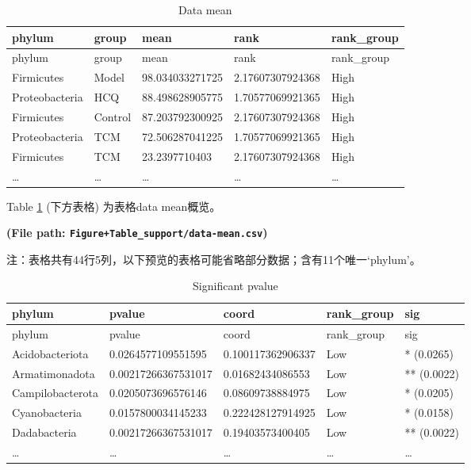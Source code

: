 \documentclass[
]{article}
\begin{document}
\begin{center}\vspace{1.5cm}\end{center}

\begin{longtable}[]{@{}lllll@{}}
\caption{\label{tab:data-mean}Data mean}\tabularnewline
\toprule
phylum & group & mean & rank & rank\_group\tabularnewline
\midrule
\endfirsthead
\toprule
phylum & group & mean & rank & rank\_group\tabularnewline
\midrule
\endhead
Firmicutes & Model & 98.034033271725 & 2.17607307924368 & High\tabularnewline
Proteobacteria & HCQ & 88.498628905775 & 1.70577069921365 & High\tabularnewline
Firmicutes & Control & 87.203792300925 & 2.17607307924368 & High\tabularnewline
Proteobacteria & TCM & 72.506287041225 & 1.70577069921365 & High\tabularnewline
Firmicutes & TCM & 23.2397710403 & 2.17607307924368 & High\tabularnewline
\ldots{} & \ldots{} & \ldots{} & \ldots{} & \ldots{}\tabularnewline
\bottomrule
\end{longtable}

Table \ref{tab:data-mean} (下方表格) 为表格data mean概览。

\textbf{(File path: \texttt{Figure+Table\_support/data-mean.csv})}

\begin{center}\begin{tcolorbox}[colback=gray!10, colframe=gray!50, width=0.9\linewidth, arc=1mm, boxrule=0.5pt]注：表格共有44行5列，以下预览的表格可能省略部分数据；含有11个唯一`phylum'。
\end{tcolorbox}
\end{center}

\begin{center}\vspace{1.5cm}\end{center}

\begin{center}\vspace{1.5cm}\end{center}

\begin{longtable}[]{@{}lllll@{}}
\caption{\label{tab:significant-pvalue}Significant pvalue}\tabularnewline
\toprule
phylum & pvalue & coord & rank\_group & sig\tabularnewline
\midrule
\endfirsthead
\toprule
phylum & pvalue & coord & rank\_group & sig\tabularnewline
\midrule
\endhead
Acidobacteriota & 0.0264577109551595 & 0.100117362906337 & Low & * (0.0265)\tabularnewline
Armatimonadota & 0.00217266367531017 & 0.01682434086553 & Low & ** (0.0022)\tabularnewline
Campilobacterota & 0.0205073696576146 & 0.08609738884975 & Low & * (0.0205)\tabularnewline
Cyanobacteria & 0.0157800034145233 & 0.222428127914925 & Low & * (0.0158)\tabularnewline
Dadabacteria & 0.00217266367531017 & 0.19403573400405 & Low & ** (0.0022)\tabularnewline
\ldots{} & \ldots{} & \ldots{} & \ldots{} & \ldots{}\tabularnewline
\bottomrule
\end{longtable}
\end{document}
